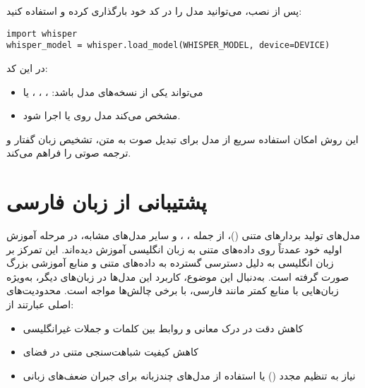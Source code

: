 \documentclass{article}
\begin{document}
پس از نصب، می‌توانید مدل را در کد خود بارگذاری کرده و استفاده کنید:

\begin{latin}
\begin{lstlisting}
import whisper
whisper_model = whisper.load_model(WHISPER_MODEL, device=DEVICE)
\end{lstlisting}
\end{latin}

در این کد:
\begin{itemize}
\item {} می‌تواند یکی از نسخه‌های مدل باشد: ، ، ،  یا 
\item {} مشخص می‌کند مدل روی  یا  اجرا شود.

\end{itemize}

این روش امکان استفاده سریع از مدل برای تبدیل صوت به متن، تشخیص زبان گفتار و ترجمه صوتی را فراهم می‌کند.


\section{پشتیبانی از زبان فارسی}

مدل‌های تولید بردارهای متنی ()، از جمله ، ،  و سایر مدل‌های مشابه، در مرحله آموزش اولیه خود عمدتاً روی داده‌های متنی به زبان انگلیسی آموزش دیده‌اند.
این تمرکز بر زبان انگلیسی به دلیل دسترسی گسترده به داده‌های متنی و منابع آموزشی بزرگ صورت گرفته است.
به‌دنبال این موضوع، کاربرد این مدل‌ها در زبان‌های دیگر، به‌ویژه زبان‌هایی با منابع کمتر مانند فارسی، با برخی چالش‌ها مواجه است.
محدودیت‌های اصلی عبارتند از:
\begin{itemize}
\item کاهش دقت در درک معانی و روابط بین کلمات و جملات غیرانگلیسی
\item کاهش کیفیت شباهت‌سنجی متنی در فضای 
\item نیاز به تنظیم مجدد () یا استفاده از مدل‌های چندزبانه برای جبران ضعف‌های زبانی
\end{itemize}
\end{document}
